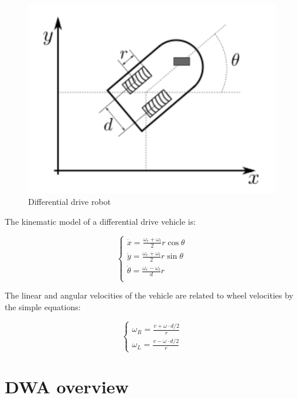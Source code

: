 \documentclass[11pt,a4paper]{article}
\begin{document}
\begin{figure}[H]
    \centering
    \includegraphics[scale=0.4]{other/differential_drive.png}
    \caption{Differential drive robot}
\end{figure}

The kinematic model of a differential drive vehicle is:

$$
\begin{cases}
    \dot{x} = \frac{\omega_r + \omega_l}{2} r \cos{\theta} \\
    \dot{y} = \frac{\omega_r + \omega_l}{2} r \sin{\theta} \\
    \dot{\theta} = \frac{\omega_r - \omega_l}{d} r \\
\end{cases}
$$

The linear and angular velocities of the vehicle are related to wheel velocities by the simple equations:

$$
\begin{cases}
    \omega_R = {\frac {v + \omega \cdot d/2}{r}} \\
    \omega_L = {\frac {v - \omega \cdot d/2}{r}}
\end{cases}
$$





\section{DWA overview}
\end{document}
